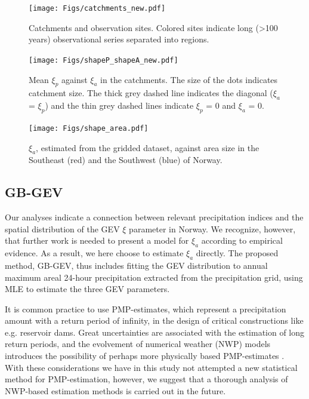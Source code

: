 \documentclass[12pt,a4paper,english]{article}
\begin{document}
\clearpage

\begin{figure}[htbp]
\begin{center}
\texttt{[image: Figs/catchments\_new.pdf]} 
\caption[Map]{\label{data:fig6}Catchments and observation sites. Colored sites indicate long (>100 years) observational series separated into regions.}
\end{center}
\end{figure}

\begin{figure}[!htbp]
\begin{center}
\texttt{[image: Figs/shapeP\_shapeA\_new.pdf]}
\caption[shape]{\label{data:fig7}Mean $\xi_{p}$ against $\xi_{a}$ in the catchments. The size of the dots indicates catchment size. The thick grey dashed line indicates the diagonal ($\xi_{a}$ = $\xi_{p}$) and the thin grey dashed lines indicate $\xi_{p}$ = 0 and $\xi_{a}$ = 0.}

\texttt{[image: Figs/shape\_area.pdf]}
\caption[shape]{\label{data:fig8}$\xi_{a}$, estimated from the gridded dataset, against area size in the Southeast (red) and the Southwest (blue) of Norway.}
\end{center}
\end{figure}

\clearpage

\subsection{GB-GEV}

Our analyses indicate a connection between relevant precipitation indices and the spatial distribution of the GEV $\xi$ parameter in Norway. We recognize, however, that further work is needed to present a model for $\xi_{a}$ according to empirical evidence. As a result, we here choose to estimate $\xi_{a}$ directly. The proposed method, GB-GEV, thus includes fitting the GEV distribution to annual maximum areal 24-hour precipitation extracted from the precipitation grid, using MLE to estimate the three GEV parameters. 

It is common practice to use PMP-estimates, which represent a precipitation amount with a return period of infinity, in the design of critical constructions like e.g. reservoir dams. %
Great uncertainties are associated with the estimation of long return periods, and the evolvement of numerical weather (NWP) models introduces the possibility of perhaps more physically based PMP-estimates \citep{Cottonetal2003,WMO2009a}. With these considerations we have in this study not attempted a new statistical method for PMP-estimation, however, we suggest that a thorough analysis of NWP-based estimation methods is carried out in the future. 
\end{document}
